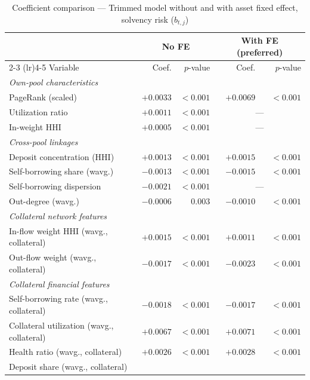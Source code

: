 \documentclass[a4paper,UKenglish,cleveref, autoref, thm-restate]{informs3}
\begin{document}
\FloatBarrier 
\begin{table}[ht]
\centering
\begin{threeparttable}
\caption{Coefficient comparison ---
         Trimmed model without and with asset fixed effect,
         solvency risk ($b_{t,j}$)}
\label{tab:coefs_comparison_solv}
\footnotesize
\begin{tabular}{lrrrr}
\toprule
& \multicolumn{2}{c}{No FE}
& \multicolumn{2}{c}{With FE (preferred)} \\
\cmidrule(lr){2-3}
\cmidrule(lr){4-5}
Variable
    & Coef. & $p$-value
    & Coef. & $p$-value \\
\midrule
\multicolumn{5}{l}{\textit{Own-pool characteristics}} \\
PageRank (scaled)
    & $+0.0033$ & $<0.001$
    & $+0.0069$ & $<0.001$ \\
Utilization ratio
    & $+0.0011$ & $<0.001$
    & \multicolumn{2}{c}{---} \\
In-weight HHI
    & $+0.0005$ & $<0.001$
    & \multicolumn{2}{c}{---} \\
\midrule
\multicolumn{5}{l}{\textit{Cross-pool linkages}} \\
Deposit concentration (HHI)
    & $+0.0013$ & $<0.001$
    & $+0.0015$ & $<0.001$ \\
Self-borrowing share (wavg.)
    & $-0.0013$ & $<0.001$
    & $-0.0015$ & $<0.001$ \\
Self-borrowing dispersion
    & $-0.0021$ & $<0.001$
    & \multicolumn{2}{c}{---} \\
Out-degree (wavg.)
    & $-0.0006$ & $0.003$
    & $-0.0010$ & $<0.001$ \\
\midrule
\multicolumn{5}{l}{\textit{Collateral network features}} \\
In-flow weight HHI (wavg., collateral)
    & $+0.0015$ & $<0.001$
    & $+0.0011$ & $<0.001$ \\
Out-flow weight (wavg., collateral)
    & $-0.0017$ & $<0.001$
    & $-0.0023$ & $<0.001$ \\
\midrule
\multicolumn{5}{l}{\textit{Collateral financial features}} \\
Self-borrowing rate (wavg., collateral)
    & $-0.0018$ & $<0.001$
    & $-0.0017$ & $<0.001$ \\
Collateral utilization (wavg., collateral)
    & $+0.0067$ & $<0.001$
    & $+0.0071$ & $<0.001$ \\
Health ratio (wavg., collateral)
    & $+0.0026$ & $<0.001$
    & $+0.0028$ & $<0.001$ \\
Deposit share (wavg., collateral)

\end{tabular}
\end{threeparttable}
\end{table}
\end{document}
